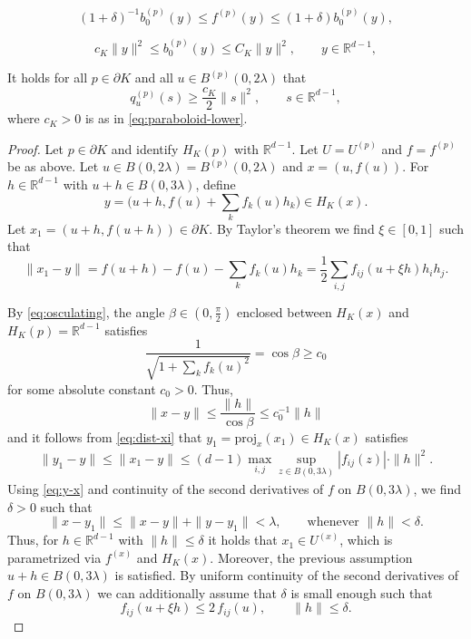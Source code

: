 \documentclass[10pt,a4paper]{amsart}
\newcommand{\IR}{\mathbb{R}}
\newcommand{\proj}{\mathrm{proj}}
\begin{document}
\begin{equation} \label{eq:osculating}
(1+\delta)^{-1}b_0^{(p)}(y)
\le f^{(p)}(y)
\le (1+\delta)b_0^{(p)}(y),
\end{equation}

\begin{equation} \label{eq:paraboloid-lower}
c_K \|y\|^2
\le b_0^{(p)}(y)
\le C_K \|y\|^2,\qquad y\in \IR^{d-1},
\end{equation}

\begin{lem}\label{lem:pd-uniform}
It holds for all $p\in \partial K$ and all $u\in B^{(p)}(0,2\lambda)$ that
\[
	q_{u}^{(p)}(s)
	\ge \frac{c_K}{2}\|s\|^2,\qquad s\in \IR^{d-1},
\]
where $c_K>0$ is as in \eqref{eq:paraboloid-lower}.
\end{lem}

\begin{proof}
Let $p\in \partial K$ and	identify $H_K(p)$ with $\IR^{d-1}$. Let $U=U^{(p)}$ and $f=f^{(p)}$ be as above. Let $u\in B(0,2\lambda)=B^{(p)}(0,2\lambda)$ and $x=(u,f(u))$.  For $h\in \IR^{d-1}$ with $u+h\in B(0,3\lambda)$, define
\[
y=\Big(u+h,f(u)+\sum_{k}f_k(u)h_k \Big)\in H_K(x).
\]
Let $x_1=(u+h,f(u+h))\in \partial K$. By Taylor's theorem we find $\xi\in [0,1]$ such that
\begin{equation} \label{eq:dist-xi}
\|x_1-y\|
=f(u+h)-f(u)-\sum_{k}f_k(u)h_k 
=\frac{1}{2}\sum_{i,j}f_{ij}(u+\xi h)h_ih_j.
\end{equation}

By \eqref{eq:osculating}, the angle $\beta\in (0,\frac{\pi}{2})$ enclosed between $H_K(x)$ and $H_K(p)=\IR^{d-1}$ satisfies 
\begin{equation} \label{eq:cos-lower}
\frac{1}{\sqrt{1+\sum_{k}f_k(u)^2}}
=\cos\beta
\ge c_0
\end{equation}
for some absolute constant $c_0>0$. Thus,
\begin{equation} \label{eq:y-x}
\|x-y\|
\le \frac{\|h\|}{\cos \beta}
\le c_0^{-1}\|h\|
\end{equation}
and it follows from \eqref{eq:dist-xi} that $y_1=\proj_x(x_1)\in H_K(x)$ satisfies
\begin{align*}
\|y_1-y\|
\le \|x_1-y\|
\le (d-1)\max_{i,j}\sup_{z\in B(0,3\lambda)} |f_{ij}(z)|\cdot \|h\|^2.
\end{align*}
Using \eqref{eq:y-x} and continuity of the second derivatives of $f$ on $B(0,3\lambda)$, we find $\delta>0$ such that
\[
\|x-y_1\|
\le \|x-y\|+\|y-y_1\|
< \lambda,\qquad \text{whenever }\|h\|<\delta. 
\]
Thus, for $h\in \IR^{d-1}$ with $\|h\|\le \delta$ it holds that $x_1\in U^{(x)}$, which is parametrized via $f^{(x)}$ and $H_K(x)$. Moreover, the previous assumption $u+h\in B(0,3\lambda)$ is satisfied. By uniform continuity of the second derivatives of $f$ on $B(0,3\lambda)$ we can additionally assume that $\delta$ is small enough such that 
\begin{equation} \label{eq:f2-uniform}
f_{ij}(u+\xi h)\le 2\,f_{ij}(u),\qquad \|h\|\le \delta.
\end{equation}


\end{proof}
\end{document}
